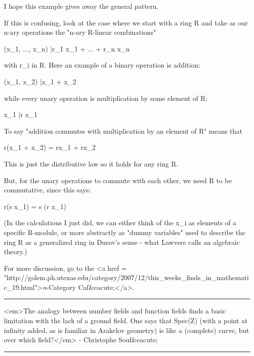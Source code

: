 I hope this example gives away the general pattern.

If this is confusing, look
at the case where we start with a ring R and take as our
n-ary operations the "n-ary R-linear combinations"

(x_{1}, ..., x_{n}) |\to  r_{1} x_{1} +
... + r_{n} x_{n}

with r_{i} in R.  Here an example of a binary operation is addition:

(x_{1}, x_{2}) |\to  x_{1} + x_{2}

while every unary operation is multiplication by some element of R:

x_{1} |\to  r x_{1}

To say "addition commutes with multiplication by an element of R"
means that

r(x_{1} + x_{2}) = rx_{1} + rx_{2}

This is just the distributive law so it holds for any ring R.

But, for the unary operations to commute with each other, we need R
to be commutative, since this says:

r(s x_{1}) = s (r x_{1})

(In the calculations I just did, we can either think of the x_{i}
as elements of a specific R-module, or more abstractly as "dummy variables"
used to describe the ring R as a generalized ring in Durov's sense -
what Lawvere calls an algebraic theory.)

For more discussion, go to the
<a href = "http://golem.ph.utexas.edu/category/2007/12/this_weeks_finds_in_mathematic_19.html">\emph{n}-Category Caf&eacute;</a>.



\par\noindent\rule{\textwidth}{0.4pt}
<em>The analogy between number fields and function fields finds a 
basic limitation with the lack of a ground field.  One says that Spec(Z)
(with a point at infinity added, as is familiar in Arakelov geometry) is 
like a (complete) curve, but over which field?</em> - Christophe Soul&eacute;

\par\noindent\rule{\textwidth}{0.4pt}

